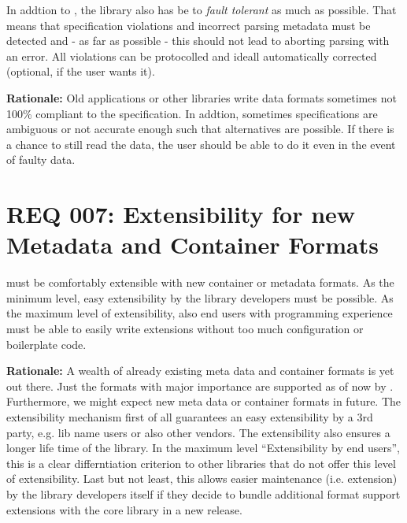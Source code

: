 In addtion to , the library also has be to \emph{fault tolerant} as much as possible. That means that specification violations and incorrect parsing metadata must be detected and - as far as possible - this should not lead to aborting parsing with an error. All violations can be protocolled and ideall automatically corrected (optional, if the user wants it).

\textbf{Rationale:} Old applications or other libraries write data formats sometimes not 100\% compliant to the specification. In addtion, sometimes specifications are ambiguous or not accurate enough such that alternatives are possible. If there is a chance to still read the data, the user should be able to do it even in the event of faulty data.


\section{REQ 007: Extensibility for new Metadata and Container Formats}
\label{sec:REQ007ErweiterbarkeitUmNeueMetadatenUndContainerformate}

\LibName{} must be comfortably extensible with new container or metadata formats. As the minimum level, easy extensibility by the library developers must be possible. As the maximum level of extensibility, also end users with programming experience must be able to easily write extensions without too much configuration or boilerplate code.

\textbf{Rationale:} A wealth of already existing meta data and container formats is yet out there. Just the formats with major importance are supported as of now by \LibName{}. Furthermore, we might expect new meta data or container formats in future. The extensibility mechanism first of all guarantees an easy extensibility by a 3rd party, e.g. lib name users or also other vendors. The extensibility also ensures a longer life time of the library. In the maximum level ``Extensibility by end users'', this is a clear differntiation criterion to other libraries that do not offer this level of extensibility. Last but not least, this allows easier maintenance (i.e. extension) by the library developers itself if they decide to bundle additional format support extensions with the core library in a new release.

